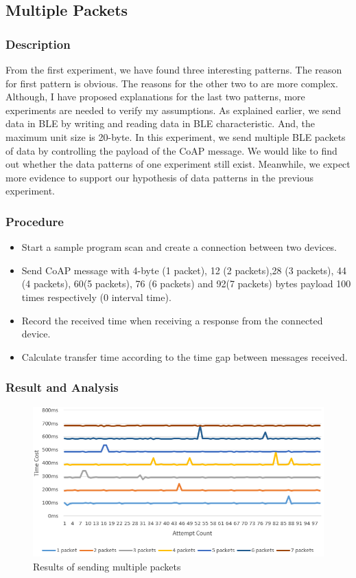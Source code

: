 \documentclass{Nan_Thesis}
\begin{document}
\subsection{Multiple Packets}
\subsubsection{Description}
From the first experiment, we have found three interesting patterns. The reason for first pattern is obvious. The reasons for the other two to are more complex. Although, I have proposed explanations for the last two patterns, more experiments are needed to verify my assumptions. As explained earlier, we send data in BLE by writing and reading data in BLE characteristic. And, the maximum unit size is 20-byte.
In this experiment, we send multiple BLE packets of data by controlling the payload of the CoAP message. We would like to find out whether the data patterns of one experiment still exist. Meanwhile, we expect more evidence to support our hypothesis of data patterns in the previous experiment.
\subsubsection{Procedure}

\begin{itemize}
  \item Start a sample program scan and create a connection between two devices.
  \item Send CoAP message with 4-byte (1 packet), 12 (2 packets),28 (3 packets), 44 (4 packets), 60(5 packets), 76 (6 packets) and 92(7 packets) bytes payload 100 times respectively (0 interval time).
  \item Record the received time when receiving a response from the connected device. 
  \item Calculate transfer time according to the time gap between messages received.
\end{itemize}

\subsubsection{Result and Analysis}

\begin{figure}[H]
  \centering 
      \includegraphics[scale=0.8]{pic/experiment2.png} 
  \caption{Results of sending multiple packets}
\end{figure}
\end{document}
